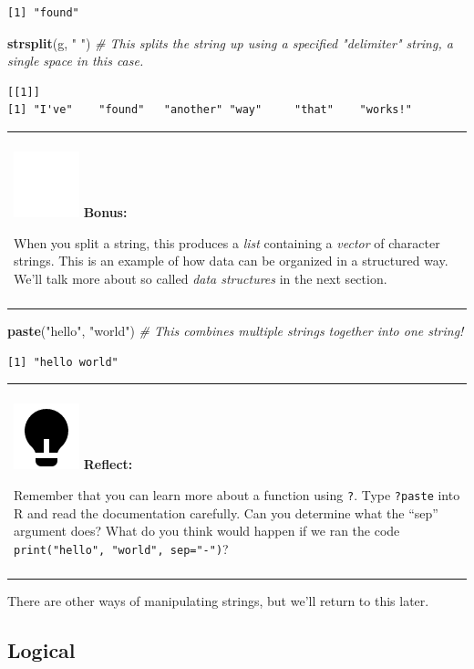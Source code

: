 \documentclass[
]{book}
\newenvironment{Shaded}{\begin{snugshade}}{\end{snugshade}}
\newcommand{\CommentTok}[1]{\textcolor[rgb]{0.56,0.35,0.01}{\textit{#1}}}
\newcommand{\KeywordTok}[1]{\textcolor[rgb]{0.13,0.29,0.53}{\textbf{#1}}}
\newcommand{\NormalTok}[1]{#1}
\newcommand{\StringTok}[1]{\textcolor[rgb]{0.31,0.60,0.02}{#1}}
\newenvironment{bonus}
{
  \begin{center}
  \begin{tabular}{|>{\columncolor{bonus}\color{white}}p{0.9\textwidth}|}\hline\\
  \includegraphics[scale=0.1]{src/images/sun-fill-invert.png}
  \textbf{Bonus:}
}
{\\\\\hline
  \end{tabular}
  \end{center}
}
\newenvironment{reflect}
{
  \begin{center}
  \begin{tabular}{|>{\columncolor{reflect}}p{0.9\textwidth}|}
  \hline\\
  \includegraphics[scale=0.1]{src/images/lightbulb-fill.png}
  \textbf{Reflect:}
}
{\\\\\hline
  \end{tabular}
  \end{center}
}
\begin{document}
\begin{verbatim}
[1] "found"
\end{verbatim}

\begin{Shaded}
\begin{Highlighting}[]
\KeywordTok{strsplit}\NormalTok{(g, }\StringTok{" "}\NormalTok{)   }\CommentTok{# This splits the string up using a specified "delimiter" string, a single space in this case. }
\end{Highlighting}
\end{Shaded}

\begin{verbatim}
[[1]]
[1] "I've"    "found"   "another" "way"     "that"    "works!" 
\end{verbatim}

\begin{bonus}
When you split a string, this produces a \emph{list} containing a
\emph{vector} of character strings. This is an example of how data can
be organized in a structured way. We'll talk more about so called
\emph{data structures} in the next section.
\end{bonus}

\begin{Shaded}
\begin{Highlighting}[]
\KeywordTok{paste}\NormalTok{(}\StringTok{"hello"}\NormalTok{, }\StringTok{"world"}\NormalTok{)   }\CommentTok{# This combines multiple strings together into one string!}
\end{Highlighting}
\end{Shaded}

\begin{verbatim}
[1] "hello world"
\end{verbatim}

\begin{reflect}
Remember that you can learn more about a function using \texttt{?}. Type
\texttt{?paste} into R and read the documentation carefully. Can you
determine what the ``sep'' argument does? What do you think would happen
if we ran the code \texttt{print("hello",\ "world",\ sep="-")}?
\end{reflect}

There are other ways of manipulating strings, but we'll return to this later.

\hypertarget{logical}{%
\subsection{Logical}\label{logical}}
\end{document}

